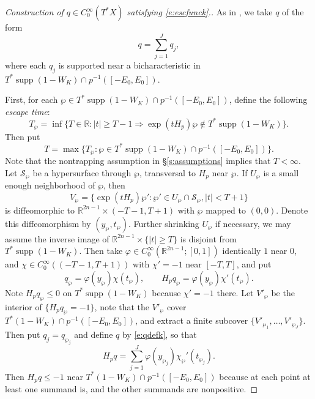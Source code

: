 \documentclass[reqno, 12pt]{amsart}
\newcommand \R {\mathbb{R}}
\DeclareMathOperator \supp {supp}
\theoremstyle{definition}
\numberwithin{equation}{section}
\numberwithin{prop}{section}
\numberwithin{figure}{section}
\begin{document}
\begin{proof}[Construction of $q \in C_0^\infty(T^*X)$ satisfying \eqref{e:escfunck}.] As in \cite[\S 4]{vz}, we  take $q$ of the form
\begin{equation}\label{e:qdefk}
q = \sum_{j=1}^J q_j,
\end{equation}
where each $q_j$ is supported near a bicharacteristic in $T^*\supp(1-W_K) \cap p^{-1}([-E_0,E_0])$.

First, for each $\wp \in T^*\supp(1-W_K) \cap p^{-1}([-E_0,E_0])$, define the following \textit{escape time}:
\[
T_\wp = \inf\{T \in \R\colon |t| \ge T-1  \Rightarrow \exp(tH_p)\wp \not\in T^*\supp(1-W_K)\}.
\]
Then put
\[
T = \max\{T_\wp\colon \wp \in T^*\supp(1-W_K) \cap p^{-1}([-E_0,E_0])\}.
\]
Note that the nontrapping assumption in \S\ref{s:assumptions} implies that $T < \infty$.  Let $\mathcal{S}_\wp$ be a hypersurface through $\wp$,  transversal to $H_p$ near $\wp$. If $U_\wp$ is a  small enough  neighborhood of $\wp$, then
\[
V_\wp = \{\exp(tH_p)\wp' \colon \wp' \in U_\wp \cap \mathcal{S}_\wp, |t| <T+1\}
\]
is diffeomorphic to $\R^{2n-1} \times (-T-1,T+1)$ with $\wp$ mapped to $(0,0)$. Denote this diffeomorphism by $(y_\wp,t_\wp)$. Further shrinking $U_\wp$ if necessary, we may  assume   the inverse image of $\R^{2n-1} \times \{|t|\ge T\}$ is disjoint from $T^*\supp(1-W_K)$. Then take $\varphi \in C_0^\infty(\R^{2n-1};[0,1])$ identically $1$ near $0$, and $\chi \in C_0^\infty((-T-1,T+1))$  with $\chi' = -1$ near $[-T,T]$, and put
\[
q_\wp = \varphi (y_\wp) \chi (t_\wp), \qquad
H_p q_\wp = \varphi(y_\wp)\chi'(t_\wp).
\]
Note $H_pq_\wp \le0$ on $T^*\supp(1-W_K)$ because $\chi' = -1$ there.
Let $V'_\wp$ be the interior of $\{H_p q_\wp = -1\}$, note that the  $V'_\wp$  cover $T^*(1-W_K) \cap p^{-1}([-E_0,E_0])$, and extract a finite subcover $\{V'_{\wp_1}, \dots, V'_{\wp_J}\}$. Then put  $q_j = q_{\wp_j}$ and define $q$ by \eqref{e:qdefk}, so that
\[
H_pq =  \sum_{j=1}^J \varphi (y_{\wp_j}) \chi_\wp' (t_{\wp_j}).
\]
Then $H_pq \le -1$ near $T^*(1-W_K) \cap p^{-1}([-E_0,E_0])$ because at each point at least one summand is, and the other summands are nonpositive.
\end{proof}
\end{document}
